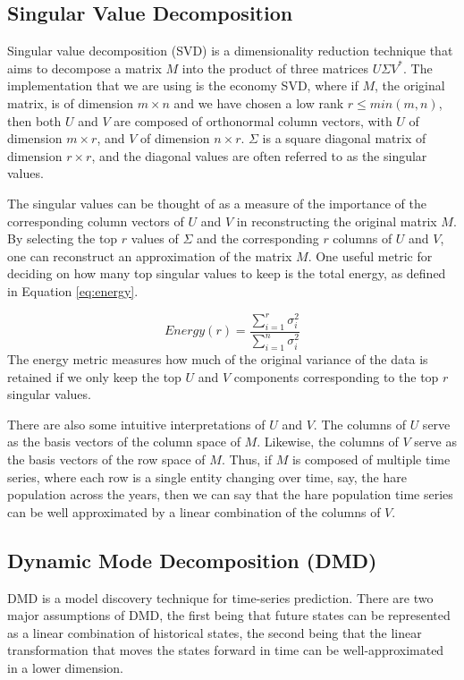 \documentclass[letterpaper, 10 pt, conference]{ieeeconf}  %
\begin{document}
\subsection{Singular Value Decomposition}
\label{section:svd}
Singular value decomposition (SVD) is a dimensionality reduction technique that aims to decompose a matrix $M$ into the product of three matrices $U\Sigma V^*$. The implementation that we are using is the economy SVD, where if $M$, the original matrix, is of dimension $m \times n$ and we have chosen a low rank $r \le min(m,n)$, then both $U$ and $V$ are composed of orthonormal column vectors, with $U$ of dimension $m \times r$, and $V$ of dimension $n \times r$. $\Sigma$ is a square diagonal matrix of dimension $r \times r$, and the diagonal values are often referred to as the singular values.

The singular values can be thought of as a measure of the importance of the corresponding column vectors of $U$ and $V$ in reconstructing the original matrix $M$. By selecting the top $r$ values of $\Sigma$ and the corresponding $r$ columns of $U$ and $V$, one can reconstruct an approximation of the matrix $M$. One useful metric for deciding on how many top singular values to keep is the total energy, as defined in Equation \ref{eq:energy}.

\begin{equation}
Energy(r) = \frac{\sum_{i=1}^r \sigma_i^2}{ \sum_{i=1}^n \sigma_i^2}
\label{eq:energy}
\end{equation}
The energy metric measures how much of the original variance of the data is retained if we only keep the top $U$  and  $V$  components corresponding to the top $r$ singular values.

There are also some intuitive interpretations of $U$ and $V$. The columns of $U$ serve as the basis vectors of the column space of $M$. Likewise, the columns of $V$ serve as the basis vectors of the row space of $M$. Thus, if $M$ is composed of multiple time series, where each row is a single entity changing over time, say, the hare population across the years, then we can say that the hare population time series can be well approximated by a linear combination of the columns of $V$.

\subsection{Dynamic Mode Decomposition (DMD)}
\label{section:dmd}
DMD\cite{schmid2010dmd} is a model discovery technique for time-series prediction. There are two major assumptions of DMD, the first being that future states can be represented as a linear combination of historical states, the second being that the linear transformation that moves the states forward in time can be well-approximated in a lower dimension.
\end{document}
